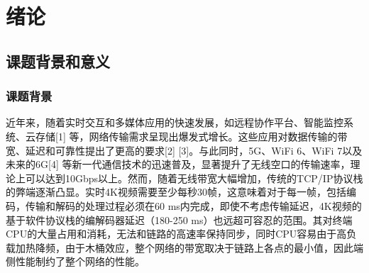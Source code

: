 \documentclass{seuthesis-2022}
\title{}{（此栏可删除）}
\author{}
\begin{document}
\maketitle
\makedeclaration

\frontmatter
\begin{abstract}[zh]
  摘要内容独立于正文而存在，是论文内容高度概括的简要陈述，应准确、具体、完整地概括论文的主要信息，内容包括研究目的、方法、过程、成果、结论及主要创新之处等，不含图表，不加注释，具有独立性和完整性，一般为400字左右。
  
  “摘要”用三号黑体加粗居中，“摘”与“要”之间空4个半角空格。摘要正文内容用小四号宋体，固定1.5倍行距。
  
  论文的关键词是反映毕业设计（论文）主题内容的名词，一般为3-5个，排在摘要正文部分下方。关键词与摘要之间空一行。关键词之间用逗号分开，最后一个关键词后不加标点符号。
\end{abstract}

\begin{abstract}[en]
  英文摘要应与中文摘相对应，250个实词左右。采用第三人称介绍该学位论文内容，叙述的基本时态为一般现在时，确实需要强调过去的事情或者已经完成的行为才使用过去时、完成时等其他时态。
  
  ABSTRACT为三号Times New Roman加粗居中。
  
  英文摘要正文为小四号Times New Roman，固定1.5倍行距。英文关键词“KEY WORDS”大写，其后的关键词第一个字母大写，关键词之间用半角逗号隔开。
\end{abstract}

\tableofcontents

\mainmatter
\chapter{绪论}
\section{课题背景和意义}
\subsection{课题背景} 
近年来，随着实时交互和多媒体应用的快速发展，如远程协作平台、智能监控系统、云存储[1] 等，网络传输需求呈现出爆发式增长。这些应用对数据传输的带宽、延迟和可靠性提出了更高的要求[2] [3]。与此同时，5G、WiFi 6、WiFi 7以及未来的6G[4] 等新一代通信技术的迅速普及，显著提升了无线空口的传输速率，理论上可以达到10Gbps以上。然而，随着无线带宽大幅增加，传统的TCP/IP协议栈的弊端逐渐凸显。实时4K视频需要至少每秒30帧，这意味着对于每一帧，包括编码，传输和解码的处理过程必须在60 ms内完成，即使不考虑传输延迟，4K视频的基于软件协议栈的编解码器延迟（180-250 ms）也远超可容忍的范围。其对终端CPU的大量占用和消耗，无法和链路的高速率保持同步，同时CPU容易由于高负载加热降频，由于木桶效应，整个网络的带宽取决于链路上各点的最小值，因此端侧性能制约了整个网络的性能。
\end{document}
